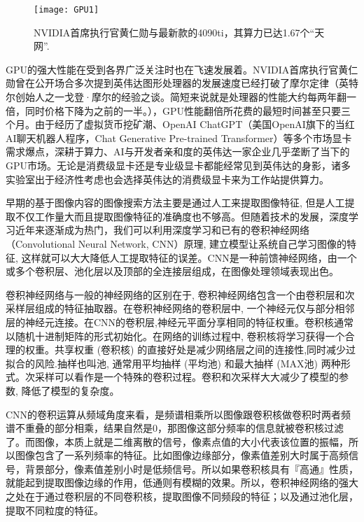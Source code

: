 \documentclass[bachelor_p]{hdu-thesis}
\begin{document}
\begin{figure}[!htb]
  \centering
  \texttt{[image: GPU1]}
  \caption{NVIDIA首席执行官黄仁勋与最新款的4090ti，其算力已达1.67个“天网”.}
  \label{fig_GPU1}
\end{figure}

GPU的强大性能在受到各界广泛关注时也在飞速发展着。NVIDIA首席执行官黄仁勋曾在公开场合多次提到英伟达图形处理器的发展速度已经打破了摩尔定律（英特尔创始人之一戈登·摩尔的经验之谈。简短来说就是处理器的性能大约每两年翻一倍，同时价格下降为之前的一半。），GPU性能翻倍所花费的最短时间甚至只要三个月。由于经历了虚拟货币挖矿潮、OpenAI ChatGPT（美国OpenAI旗下的当红AI聊天机器人程序，Chat Generative Pre-trained Transformer）等多个市场显卡需求爆点，深耕于算力、AI与开发者亲和度的英伟达一家企业几乎垄断了当下的GPU市场。无论是消费级显卡还是专业级显卡都能经常见到英伟达的身影，诸多实验室出于经济性考虑也会选择英伟达的消费级显卡来为工作站提供算力。

早期的基于图像内容的图像搜索方法主要是通过人工来提取图像特征, 但是人工提取不仅工作量大而且提取图像特征的准确度也不够高。但随着技术的发展，深度学习近年来逐渐成为热门，我们可以利用深度学习和已有的卷积神经网络（Convolutional Neural Network, CNN）原理, 建立模型让系统自己学习图像的特征, 这样就可以大大降低人工提取特征的误差\citep{CNN1}。CNN是一种前馈神经网络，由一个或多个卷积层、池化层以及顶部的全连接层组成，在图像处理领域表现出色。

卷积神经网络与一般的神经网络的区别在于, 卷积神经网络包含一个由卷积层和次采样层组成的特征抽取器。在卷积神经网络的卷积层中, 一个神经元仅与部分相邻层的神经元连接。在CNN的卷积层,神经元平面分享相同的特征权重。卷积核通常以随机十进制矩阵的形式初始化。在网络的训练过程中, 卷积核将学习获得一个合理的权重。共享权重 (卷积核) 的直接好处是减少网络层之间的连接性,同时减少过拟合的风险.抽样也叫池, 通常用平均抽样 (平均池) 和最大抽样 (MAX池) 两种形式。次采样可以看作是一个特殊的卷积过程。卷积和次采样大大减少了模型的参数, 降低了模型的复杂度\citep{CNN1}。

CNN的卷积运算从频域角度来看，是频谱相乘所以图像跟卷积核做卷积时两者频谱不重叠的部分相乘，结果自然是0，那图像这部分频率的信息就被卷积核过滤了。而图像，本质上就是二维离散的信号，像素点值的大小代表该位置的振幅，所以图像包含了一系列频率的特征。比如图像边缘部分，像素值差别大时属于高频信号，背景部分，像素值差别小时是低频信号。所以如果卷积核具有『高通』性质，就能起到提取图像边缘的作用，低通则有模糊的效果。所以，卷积神经网络的强大之处在于通过卷积层的不同卷积核，提取图像不同频段的特征；以及通过池化层，提取不同粒度的特征\citep{CNN2}。
\end{document}

